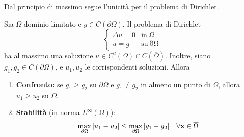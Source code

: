 Dal principio di massimo segue l'unicità per il problema di Dirichlet.
\begin{theorem}
    \label{thm:armoniche-unicita-dirichlet}
    Sia $\displaystyle \Omega $ dominio limitato e $\displaystyle g\in C(\partial \Omega)$. Il problema di Dirichlet
    \begin{equation*}
        \begin{cases}
            \Delta u=0 & \text{in} \ \Omega                   \\
            u=g        & \text{su}\mathrm{\ \partial \Omega }
        \end{cases}
    \end{equation*}
    ha al massimo una soluzione $\displaystyle u\in C^{2}(\Omega) \cap C(\overline{\Omega})$. Inoltre, siano $\displaystyle g_{1},g_{2} \in C(\partial \Omega)$, e $\displaystyle u_{1},u_{2}$ le corrispondenti soluzioni. Allora
    \begin{enumerate}
        \item \textbf{Confronto:} se $\displaystyle g_{1} \geqslant g_{2}$ su $\displaystyle \partial \Omega$ e $g_{1}\neq g_{2}$ in almeno un punto di $\Omega$, allora $u_{1} \geqslant u_{2}$ su $\displaystyle \Omega $.
        \item \textbf{Stabilità }(in norma $\displaystyle L^{\infty }(\Omega)$):
              \begin{equation}
                  \max_{\partial \Omega }| u_{1} -u_{2}| \leq \max_{\partial \Omega }| g_{1} -g_{2}| \quad \forall \mathbf{x}\in \overline{\Omega }
                  \label{eq:lap-stabilita}
              \end{equation}
    \end{enumerate}
\end{theorem}

